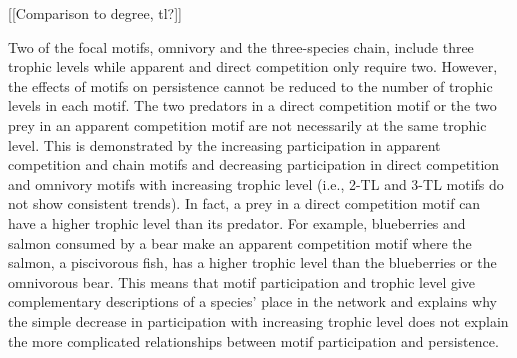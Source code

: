\documentclass[12pt]{article}
\begin{document}
\begin{spacing}{2.0}
    
    
[[Comparison to degree, tl?]]

    Two of the focal motifs, omnivory and the three-species chain, include three trophic levels while apparent and direct competition only require two.
    However, the effects of motifs on persistence cannot be reduced to the number of trophic levels in each motif.
    The two predators in a direct competition motif or the two prey in an apparent competition motif are not necessarily at the same trophic level. This is demonstrated by the increasing participation in apparent competition and chain motifs and decreasing participation in direct competition and omnivory motifs with increasing trophic level (i.e., 2-TL and 3-TL motifs do not show consistent trends).
    In fact, a prey in a direct competition motif can have a higher trophic level than its predator.
    For example, blueberries and salmon consumed by a bear make an apparent competition motif where the salmon, a piscivorous fish, has a higher trophic level than the blueberries or the omnivorous bear.
    This means that motif participation and trophic level give complementary descriptions of a species' place in the network and explains why the simple decrease in participation with increasing trophic level does not explain the more complicated relationships between motif participation and persistence.
    

\end{spacing}
\end{document}
